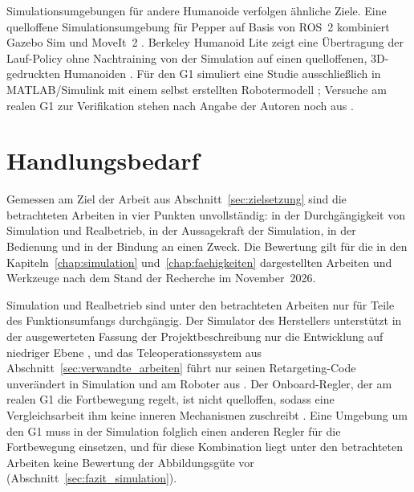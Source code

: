 Simulationsumgebungen für andere Humanoide verfolgen ähnliche Ziele.
Eine quelloffene Simulationsumgebung für Pepper auf Basis von ROS~2 \cite{Sekkat2024} kombiniert Gazebo Sim und MoveIt~2 \cite{Sekkat2024}.
Berkeley Humanoid Lite zeigt eine Übertragung der Lauf-Policy ohne Nachtraining von der Simulation auf einen quelloffenen, 3D-gedruckten Humanoiden \cite{Chi2025}.
Für den G1 simuliert eine Studie ausschließlich in MATLAB/Simulink mit einem selbst erstellten Robotermodell \cite{Yu2026}; Versuche am realen G1 zur Verifikation stehen nach Angabe der Autoren noch aus \cite{Yu2026}.

\section{Handlungsbedarf}
\label{sec:handlungsbedarf}
Gemessen am Ziel der Arbeit aus Abschnitt~\ref{sec:zielsetzung} sind die betrachteten Arbeiten in vier Punkten unvollständig: in der Durchgängigkeit von Simulation und Realbetrieb, in der Aussagekraft der Simulation, in der Bedienung und in der Bindung an einen Zweck.
Die Bewertung gilt für die in den Kapiteln~\ref{chap:simulation} und~\ref{chap:faehigkeiten} dargestellten Arbeiten und Werkzeuge nach dem Stand der Recherche im November~2026.

Simulation und Realbetrieb sind unter den betrachteten Arbeiten nur für Teile des Funktionsumfangs durchgängig.
Der Simulator des Herstellers unterstützt in der ausgewerteten Fassung der Projektbeschreibung nur die Entwicklung auf niedriger Ebene \cite{UnitreeMujoco}, und das Teleoperationssystem aus Abschnitt~\ref{sec:verwandte_arbeiten} führt nur seinen Retargeting-Code unverändert in Simulation und am Roboter aus \cite{Durrani2026}.
Der Onboard-Regler, der am realen G1 die Fortbewegung regelt, ist nicht quelloffen, sodass eine Vergleichsarbeit ihm keine inneren Mechanismen zuschreibt \cite{Hu2026}.
Eine Umgebung um den G1 muss in der Simulation folglich einen anderen Regler für die Fortbewegung einsetzen, und für diese Kombination liegt unter den betrachteten Arbeiten keine Bewertung der Abbildungsgüte vor (Abschnitt~\ref{sec:fazit_simulation}).

